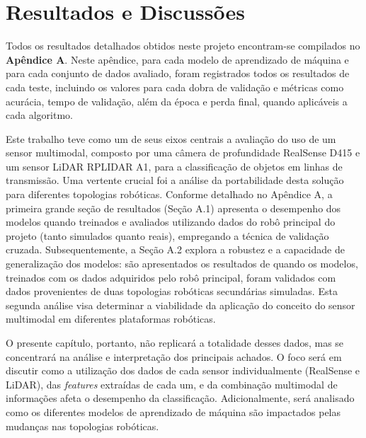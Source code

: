 \chapter{Resultados e Discussões}
\label{ch:resultados_discussoes}

Todos os resultados detalhados obtidos neste projeto encontram-se compilados no \textbf{Apêndice A}. Neste apêndice, para cada modelo de aprendizado de máquina e para cada conjunto de dados avaliado, foram registrados todos os resultados de cada teste, incluindo os valores para cada dobra de validação e métricas como acurácia, tempo de validação, além da época e perda final, quando aplicáveis a cada algoritmo.

Este trabalho teve como um de seus eixos centrais a avaliação do uso de um sensor multimodal, composto por uma câmera de profundidade RealSense D415 e um sensor LiDAR RPLIDAR A1, para a classificação de objetos em linhas de transmissão. Uma vertente crucial foi a análise da portabilidade desta solução para diferentes topologias robóticas. Conforme detalhado no Apêndice A, a primeira grande seção de resultados (Seção A.1) apresenta o desempenho dos modelos quando treinados e avaliados utilizando dados do robô principal do projeto (tanto simulados quanto reais), empregando a técnica de validação cruzada. Subsequentemente, a Seção A.2 explora a robustez e a capacidade de generalização dos modelos: são apresentados os resultados de quando os modelos, treinados com os dados adquiridos pelo robô principal, foram validados com dados provenientes de duas topologias robóticas secundárias simuladas. Esta segunda análise visa determinar a viabilidade da aplicação do conceito do sensor multimodal em diferentes plataformas robóticas.

O presente capítulo, portanto, não replicará a totalidade desses dados, mas se concentrará na análise e interpretação dos principais achados. O foco será em discutir como a utilização dos dados de cada sensor individualmente (RealSense e LiDAR), das \textit{features} extraídas de cada um, e da combinação multimodal de informações afeta o desempenho da classificação. Adicionalmente, será analisado como os diferentes modelos de aprendizado de máquina são impactados pelas mudanças nas topologias robóticas.

